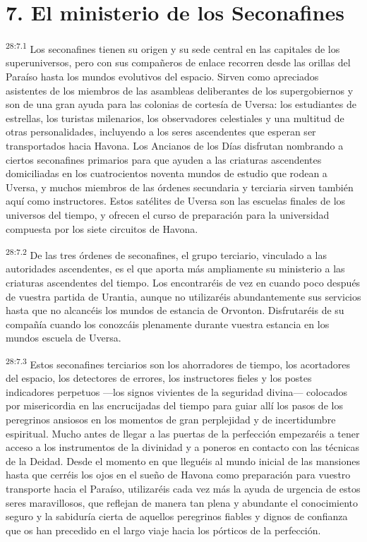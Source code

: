 \section*{7. El ministerio de los Seconafines}
\par
\textsuperscript{28:7.1} Los seconafines tienen su origen y su sede central en las capitales de los superuniversos, pero con sus compañeros de enlace recorren desde las orillas del Paraíso hasta los mundos evolutivos del espacio. Sirven como apreciados asistentes de los miembros de las asambleas deliberantes de los supergobiernos y son de una gran ayuda para las colonias de cortesía de Uversa: los estudiantes de estrellas, los turistas milenarios, los observadores celestiales y una multitud de otras personalidades, incluyendo a los seres ascendentes que esperan ser transportados hacia Havona. Los Ancianos de los Días disfrutan nombrando a ciertos seconafines primarios para que ayuden a las criaturas ascendentes domiciliadas en los cuatrocientos noventa mundos de estudio que rodean a Uversa, y muchos miembros de las órdenes secundaria y terciaria sirven también aquí como instructores. Estos satélites de Uversa son las escuelas finales de los universos del tiempo, y ofrecen el curso de preparación para la universidad compuesta por los siete circuitos de Havona.

\par
\textsuperscript{28:7.2} De las tres órdenes de seconafines, el grupo terciario, vinculado a las autoridades ascendentes, es el que aporta más ampliamente su ministerio a las criaturas ascendentes del tiempo. Los encontraréis de vez en cuando poco después de vuestra partida de Urantia, aunque no utilizaréis abundantemente sus servicios hasta que no alcancéis los mundos de estancia de Orvonton. Disfrutaréis de su compañía cuando los conozcáis plenamente durante vuestra estancia en los mundos escuela de Uversa.

\par
\textsuperscript{28:7.3} Estos seconafines terciarios son los ahorradores de tiempo, los acortadores del espacio, los detectores de errores, los instructores fieles y los postes indicadores perpetuos ---los signos vivientes de la seguridad divina--- colocados por misericordia en las encrucijadas del tiempo para guiar allí los pasos de los peregrinos ansiosos en los momentos de gran perplejidad y de incertidumbre espiritual. Mucho antes de llegar a las puertas de la perfección empezaréis a tener acceso a los instrumentos de la divinidad y a poneros en contacto con las técnicas de la Deidad. Desde el momento en que lleguéis al mundo inicial de las mansiones hasta que cerréis los ojos en el sueño de Havona como preparación para vuestro transporte hacia el Paraíso, utilizaréis cada vez más la ayuda de urgencia de estos seres maravillosos, que reflejan de manera tan plena y abundante el conocimiento seguro y la sabiduría cierta de aquellos peregrinos fiables y dignos de confianza que os han precedido en el largo viaje hacia los pórticos de la perfección.

